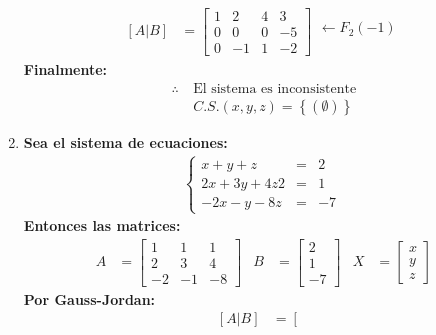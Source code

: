 \documentclass[10pt, a4paper]{article}
\begin{document}
\begin{enumerate}
\begin{align*}
    \left[A|B\right]&=\left[
      \begin{array}{ccc|c}
        1 & 2 & 4 & 3\\
        0 & 0 & 0 & -5\\
        0 & -1 & 1 & -2
      \end{array}
    \right]
    \begin{array}{r}
      \\\\
      \leftarrow F_2\left(-1\right)\\
      \\\\
    \end{array}
  \end{align*}
  \textbullet\textbf{Finalmente:}
  \begin{align*}
    \therefore \ &\text{El sistema es inconsistente}\\
    &C.S. \left(x,y,z\right) = \left\{\left(\emptyset\right)\right\}
  \end{align*}
  \item \textbf{Sea el sistema de ecuaciones:}
  \begin{align*}
    \left\{
    \begin{array}{rcl}
      x+y+z &= &2\\
      2x+3y+4z 2&= &1\\
      -2x-y-8z &= &-7
    \end{array}
    \right.\
  \end{align*}
  \textbullet\textbf{Entonces las matrices:}
  \begin{align*}
    A &= \begin{bmatrix}
      1 & 1 & 1\\
      2 & 3 & 4\\
      -2 & -1 & -8
    \end{bmatrix}&
    B &= \begin{bmatrix}
      2\\
      1\\
      -7
    \end{bmatrix}&
    X &= \begin{bmatrix}
      x\\
      y\\
      z
    \end{bmatrix}
  \end{align*}
  \textbullet\textbf{Por Gauss-Jordan:}
  \begin{align*}
    \left[A|B\right]&=\left[
      \begin{array}{ccc|c}

\end{array}
\end{align*}
\end{enumerate}
\end{document}
